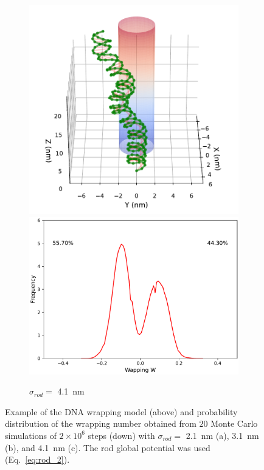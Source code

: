 \documentclass[a4paper,10pt]{article}
\begin{document}
\begin{figure}[tb]
\begin{subfigure}{.3\textwidth}
\includegraphics[width=\textwidth]{r2_C_2000000_18.pdf}
\includegraphics[width=\textwidth]{r2_C_wr_pr.pdf}
\caption{$\sigma_{rod}=$ \SI{4.1}{\nm}}
\label{fig:r2_c}
\end{subfigure}
\caption{Example of the DNA wrapping model (above) and probability distribution of the wrapping number obtained from $20$ Monte Carlo simulations of $2\times 10^6$ steps (down) with $\sigma_{rod}=$ \SI{2.1}{\nm} (a), \SI{3.1}{\nm} (b), and \SI{4.1}{\nm} (c). The rod global potential was used (Eq.~\ref{eq:rod_2}).}
\label{fig:r2}
\end{figure}
\end{document}
